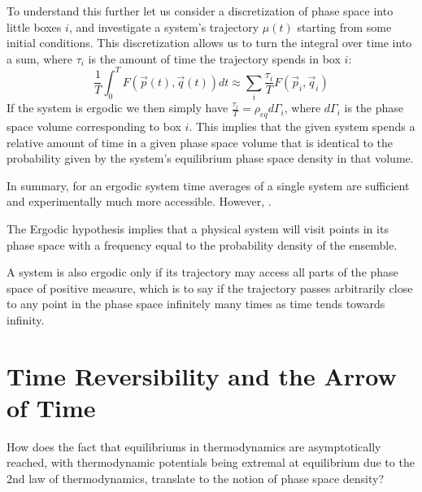 \documentclass[12pt, a4paper, oneside, openright, titlepage]{book}
\begin{document}
To understand this further let us consider a discretization of phase space into little boxes $i$, and investigate a system's trajectory $\mu(t)$ starting from some initial conditions. This discretization allows us to turn the integral over time into a sum, where $\tau_i$ is the amount of time the trajectory spends in box $i$: \begin{equation*}
    \frac{1}{T}\int_0^T F(\vec{p}(t),\vec{q}(t))dt \approx \sum_i\frac{\tau_i}{T}F(\vec{p}_i,\vec{q}_i)
\end{equation*}
If the system is ergodic we then simply have $\frac{\tau_i}{T} = \rho_{eq}d\Gamma_i$, where $d\Gamma_i$ is the phase space volume corresponding to box $i$. This implies that the given system spends a relative amount of time in a given phase space volume that is identical to the probability given by the system's equilibrium phase space density in that volume.

\begin{rmk}
    In summary, for an ergodic system time averages of a single system are sufficient and experimentally much more accessible. However, .
\end{rmk}


\begin{note}
    The Ergodic hypothesis implies that a physical system will visit points in its phase space with a frequency equal to the probability density of the ensemble. 
\end{note}


A system is also ergodic only if its trajectory may access all parts of the phase space of positive measure, which is to say if the trajectory passes arbitrarily close to any point in the phase space infinitely many times as time tends towards infinity.

\section{Time Reversibility and the Arrow of Time}


How does the fact that equilibriums in thermodynamics are asymptotically reached, with thermodynamic potentials being extremal at equilibrium due to the 2nd law of thermodynamics, translate to the notion of phase space density?
\end{document}
